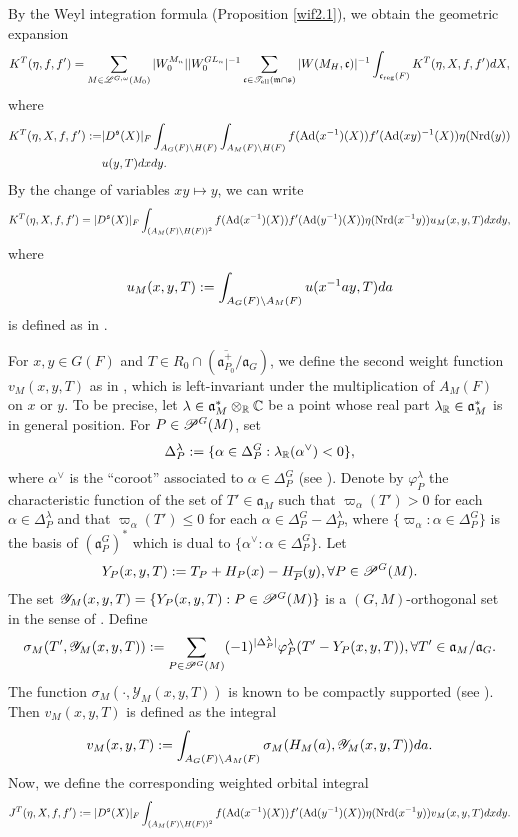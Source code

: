 \documentclass[a4paper]{amsart}
\newcommand{\msy}{\mathscr{Y}}\newcommand{\msz}{\mathscr{Z}}
\newcommand{\fa}{{\mathfrak{a}}} \newcommand{\fb}{{\mathfrak{b}}}\newcommand{\fc}{{\mathfrak{c}}} \newcommand{\fd}{{\mathfrak{d}}}
\newcommand{\fm}{{\mathfrak{m}}} \newcommand{\fn}{{\mathfrak{n}}}\newcommand{\fo}{{\mathfrak{o}}} \newcommand{\fp}{{\mathfrak{p}}}
\newcommand{\ov}{\overline}
\theoremstyle{definition}
\theoremstyle{remark}
\numberwithin{equation}{subsection}
\begin{document}
By the Weyl integration formula (Proposition \ref{wif2.1}), we obtain the geometric expansion
$$ K^T(\eta, f, f')=\sum_{M\in\msl^{G,\omega}(M_0)} |W_0^{M_n}| |W_0^{GL_n}|^{-1} \sum_{\fc\in\mst_\el(\fm\cap\fs)} |W(M_H, \fc)|^{-1} \int_{\fc_\reg(F)} K^T(\eta, X, f, f') dX, $$
where
\[\begin{split}
 K^T(\eta, X, f, f'):=&|D^{\mathfrak{s}}(X)|_F \int_{A_G(F)\backslash H(F)} \int_{A_M(F)\backslash H(F)} f({\mathrm{Ad}}(x^{-1})(X)) f'({\mathrm{Ad}}(xy)^{-1} (X)) \eta({\mathrm{Nrd}}(y)) \\ 
&u(y, T) dx dy. 
\end{split}\]
By the change of variables $xy\mapsto y$, we can write
\begin{equation}\label{firstwoi}
 K^T(\eta, X, f, f')=|D^{\mathfrak{s}}(X)|_F \int_{(A_M(F)\backslash H(F))^2} f({\mathrm{Ad}}(x^{-1})(X)) f'({\mathrm{Ad}}(y^{-1})(X)) \eta({\mathrm{Nrd}}(x^{-1}y)) u_M(x, y, T) dx dy, 
\end{equation}
where
$$ u_M(x, y, T):=\int_{A_G(F)\backslash A_M(F)} u(x^{-1}ay, T) da $$
is defined as in \cite[p. 21]{MR1114210}. 

For $x,y\in G(F)$ and $T\in R_0\cap(\ov{\fa_{P_0}^+}/\fa_G)$, we define the second weight function $v_M(x, y, T)$ as in \cite[p. 30]{MR1114210}, which is left-invariant under the multiplication of $A_M(F)$ on $x$ or $y$. To be precise, let $\lambda\in\fa_M^\ast\otimes_\BR\BC$ be a point whose real part $\lambda_\BR\in\fa_M^\ast$ is in general position. For $P\in\mathscr{P}^G(M)$, set 
$$ \Delta_P^\lambda:=\{\alpha\in\Delta_P^G: \lambda_{\mathbb {R}}(\alpha^\vee)<0\}, $$
where $\alpha^\vee$ is the ``coroot'' associated to $\alpha\in\Delta_P^G$ (see \cite[p. 26]{MR2192011}). Denote by $\varphi_P^\lambda$ the characteristic function of the set of $T'\in\fa_M$ such that $\varpi_\alpha(T')>0$ for each $\alpha\in\Delta_P^\lambda$ and that $\varpi_\alpha(T')\leq0$ for each $\alpha\in\Delta_P^G-\Delta_P^\lambda$, where $\{\varpi_\alpha: \alpha\in\Delta_P^G\}$ is the basis of $(\fa_P^G)^\ast$ which is dual to $\{\alpha^\vee: \alpha\in\Delta_P^G\}$. Let 
$$ Y_P(x,y,T):=T_P+H_P(x)-H_{\ov{P}}(y), \forall P\in\msp^G(M). $$
The set $\msy_M(x,y,T)=\{Y_P(x,y,T): P\in\msp^G(M)\}$ is a $(G,M)$-orthogonal set in the sense of \cite[p. 19]{MR1114210}. Define 
$$ \sigma_M(T', \msy_M(x,y,T)):=\sum_{P\in\msp^G(M)} (-1)^{|\Delta_P^\lambda|} \varphi_P^\lambda(T'-Y_P(x,y,T)), \forall T'\in\fa_M/\fa_G. $$
The function $\sigma_M(\cdot, \msy_M(x,y,T))$ is known to be compactly supported (see \cite[p. 22]{MR1114210}). Then $v_M(x, y, T)$ is defined as the integral 
$$ v_M(x, y, T):=\int_{A_G(F)\bs A_M(F)} \sigma_M(H_M(a), \msy_M(x,y,T))da. $$
Now, we define the corresponding weighted orbital integral 
\begin{equation}\label{secondwoi}
 J^T(\eta, X, f, f'):=|D^{\mathfrak{s}}(X)|_F \int_{(A_M(F)\backslash H(F))^2} f({\mathrm{Ad}}(x^{-1})(X)) f'({\mathrm{Ad}}(y^{-1})(X)) \eta({\mathrm{Nrd}}(x^{-1}y)) v_M(x, y, T) dx dy. 
\end{equation}
\end{document}
